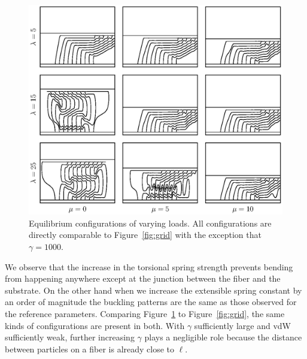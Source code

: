 	\begin{figure}
		\begin{center}
			\includegraphics[scale=1]{./fig/ch4/grid_g1000.eps}
		\end{center}		
		\caption{Equilibrium configurations of varying loads. All configurations are directly comparable to Figure~\ref{fig:grid} with the exception that $\gamma = 1000$.
		\label{fig:grid_g1000}}
	\end{figure}
	
	We observe that the increase in the torsional spring strength prevents bending from happening anywhere except at the junction between the fiber and the substrate. On the other hand when we increase the extensible spring constant by an order of magnitude the buckling patterns are the same as those observed for the reference parameters. Comparing Figure~\ref{fig:grid_g1000} to Figure~\ref{fig:grid}, the same kinds of configurations are present in both. With $\gamma$ sufficiently large and vdW sufficiently weak, further increasing $\gamma$ plays a negligible role because the distance between particles on a fiber is already close to $\ell$.
	
